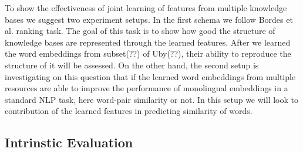 \documentclass[11pt]{article}
\begin{document}
To show the effectiveness of joint learning of features from multiple knowledge bases we suggest 
two experiment setups. In the first schema we follow Bordes et al. ranking task. The goal of this task is
to show how good the structure of knowledge bases are represented through the learned features. 
After we learned the word embeddings from subset(??) of Uby(??),
their ability to reproduce the structure of it will be assessed. On the other hand, the second
setup is investigating on this question that if the learned word embeddings from multiple resources
are able to improve the performance of monolingual embeddings in a standard NLP
task, here word-pair similarity or not.
In this setup we will look to contribution of the learned features in predicting similarity of words.

\subsection{Intrinstic Evaluation}
\label{ssec:intrinsic}
\end{document}

